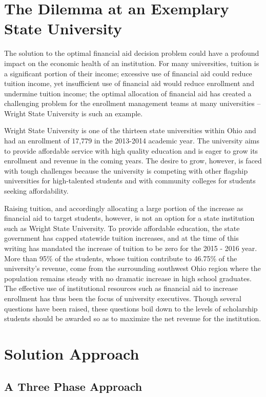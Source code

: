 \documentclass[12pt,english]{report}
\begin{document}
\section{The Dilemma at an Exemplary State University}
The solution to the optimal financial aid decision problem could have a
profound impact on the economic health of an institution.  For many
universities, tuition is a significant portion of their income; excessive use
of financial aid  could reduce tuition income, yet insufficient use of
financial aid would reduce enrollment and undermine tuition income; the optimal
allocation of financial aid has created a challenging problem for the
enrollment management teams at many universities -- Wright State University is
such an example.

Wright State University is one of the thirteen state universities within Ohio
and had an enrollment of 17,779  in the 2013-2014 academic year. The university
aims to provide affordable service with high quality education and is eager to
grow its enrollment and revenue in the coming years.  The desire to grow,
however, is faced with tough challenges because the university is competing
with other flagship universities for high-talented students and with community
colleges for students seeking affordability.

Raising tuition, and accordingly allocating a large portion of the increase as
financial aid to target students, however, is not an option for a state
institution such as Wright State University. To provide affordable education,
the state government has capped statewide tuition increases, and at the time of
this writing has mandated the increase of tuition to be zero for the 2015 -
2016 year. More than 95\% of the students, whose tuition contribute to 46.75\%
of the university's revenue, come from the surrounding southwest Ohio region
where the population remains steady with no dramatic increase in high school
graduates. The effective use of institutional resources such as financial aid
to increase enrollment has thus been the focus of university executives.
Though several questions have been raised, these questions boil down to the
levels of scholarship students should be awarded so as to maximize the net
revenue for the institution.


\section{Solution Approach}
\subsection{A Three Phase Approach}
\end{document}
